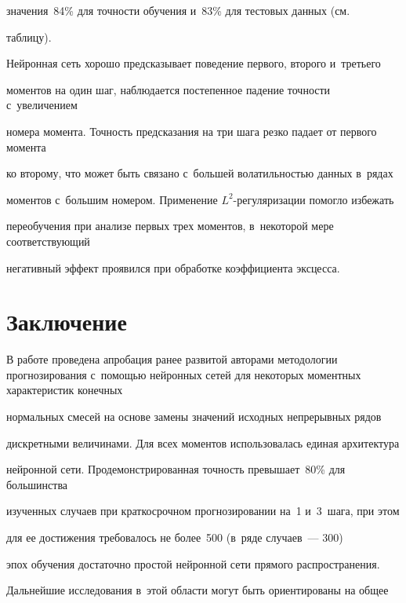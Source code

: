 значения~84\% для точности обучения и~83\% для тестовых данных (см.\ 


таблицу).











Нейронная сеть хорошо предсказывает поведение первого, второго и~третьего 


моментов на один шаг, наблюдается постепенное падение точности с~увеличением 


номера момента. Точность предсказания на три шага резко падает от первого момента 


ко второму, что может быть связано с~большей волатильностью данных в~рядах 


моментов с~большим номером. Применение $L^2$-ре\-гу\-ля\-ри\-за\-ции помогло избежать 


переобучения при анализе первых трех моментов, в~некоторой мере соответствующий 


негативный эффект проявился при обработке коэффициента эксцесса. 





\section{Заключение}





В работе проведена апробация ранее развитой авторами методологии прогнозирования с~помощью нейронных сетей для некоторых моментных характеристик конечных 


нормальных смесей на основе замены значений исходных непрерывных рядов 


дискретными величинами. Для всех моментов использовалась единая архитектура 


нейронной сети. Продемонстрированная точность превышает~80\% для большинства 


изученных случаев при краткосрочном прогнозировании на~1 и~3~шага, при этом 


для ее достижения требовалось не более~500 (в~ряде случаев~--- 300) 


эпох обучения достаточно простой нейронной сети прямого распространения. 


Дальнейшие исследования в~этой области могут быть ориентированы на общее 


